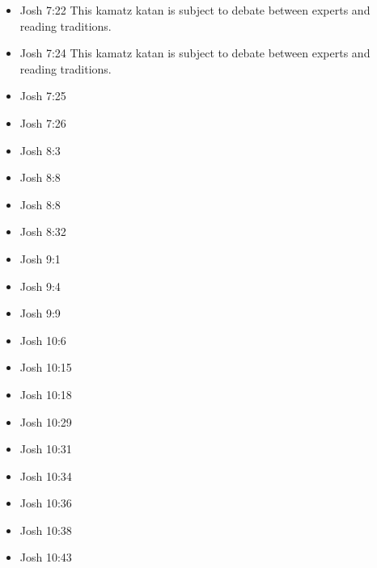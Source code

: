 \documentclass[14pt]{book}
\begin{document}
\begin{multicols}{2}
\begin{itemize}
	\item Josh 7:22 This kamatz katan is subject to debate between experts and reading traditions.
	
	\item Josh 7:24 This kamatz katan is subject to debate between experts and reading traditions.
	
	\item Josh 7:25
	
	\item Josh 7:26
	
	\item Josh 8:3
	
	\item Josh 8:8
			
			\item Josh 8:8
			
			\item Josh 8:32
			
			\item Josh 9:1
			
			\item Josh 9:4
			
			\item Josh 9:9
			
			\item Josh 10:6
			
			\item Josh 10:15
			
			\item Josh 10:18
			
			\item Josh 10:29
			
			\item Josh 10:31
			
			\item Josh 10:34
			
			\item Josh 10:36
			
			\item Josh 10:38
			
			\item Josh 10:43
			

\end{itemize}
\end{multicols}
\end{document}
